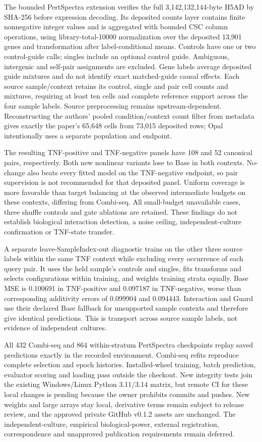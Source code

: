 The bounded PertSpectra extension verifies the full 3,142,132,144-byte H5AD by SHA-256 before expression decoding. Its deposited counts layer contains finite nonnegative integer values and is aggregated with bounded CSC column operations, using library-total-10000 normalization over the deposited 13,901 genes and transformation after label-conditional means. Controls have one or two control-guide calls; singles include an optional control guide. Ambiguous, intergenic and self-pair assignments are excluded. Gene labels average deposited guide mixtures and do not identify exact matched-guide causal effects. Each source sample/context retains its control, single and pair cell counts and mixtures, requiring at least ten cells and complete reference support across the four sample labels. Source preprocessing remains upstream-dependent. Reconstructing the authors' pooled condition/context count filter from metadata gives exactly the paper's 65,648 cells from 73,015 deposited rows; Opal intentionally uses a separate population and endpoint.

The resulting TNF-positive and TNF-negative panels have 108 and 52 canonical pairs, respectively. Both new nonlinear variants lose to Base in both contexts. No-change also beats every fitted model on the TNF-negative endpoint, so pair supervision is not recommended for that deposited panel. Uniform coverage is more favorable than target balancing at the observed intermediate budgets on these contexts, differing from Combi-seq. All small-budget unavailable cases, three shuffle controls and gate ablations are retained. These findings do not establish biological interaction detection, a noise ceiling, independent-culture confirmation or TNF-state transfer.

A separate leave-SampleIndex-out diagnostic trains on the other three source labels within the same TNF context while excluding every occurrence of each query pair. It uses the held sample's controls and singles, fits transforms and selects configurations within training, and weights training strata equally. Base MSE is 0.100691 in TNF-positive and 0.097187 in TNF-negative, worse than corresponding additivity errors of 0.099904 and 0.094443. Interaction and Guard use their declared Base fallback for unsupported sample contexts and therefore give identical predictions. This is transport across source sample labels, not evidence of independent cultures.

All 432 Combi-seq and 864 within-stratum PertSpectra checkpoints replay saved predictions exactly in the recorded environment. Combi-seq refits reproduce complete selection and epoch histories. Installed-wheel training, batch prediction, evaluator scoring and loading pass outside the checkout. New integrity tests join the existing Windows/Linux Python 3.11/3.14 matrix, but remote CI for these local changes is pending because the owner prohibits commits and pushes. New weights and large arrays stay local, derivative terms remain subject to release review, and the approved private GitHub v0.1.2 assets are unchanged. The independent-culture, empirical biological-power, external registration, correspondence and unapproved publication requirements remain deferred.
